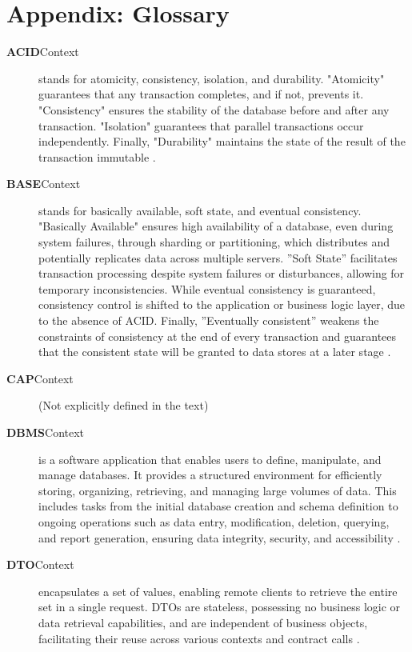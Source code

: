 \section{Appendix: Glossary}
\label{appendix:glossary}

\begin{description}

\item[\textbf{ACID}Context] stands for atomicity, consistency, isolation, and durability. "Atomicity" guarantees that any transaction completes, and if not, prevents it. "Consistency" ensures the stability of the database before and after any transaction. "Isolation" guarantees that parallel transactions occur independently. Finally, "Durability" maintains the state of the result of the transaction immutable \cite{jatana2012survey}.

\item[\textbf{BASE}Context] stands for basically available, soft state, and eventual consistency. "Basically Available" ensures high availability of a database, even during system failures, through sharding or partitioning, which distributes and potentially replicates data across multiple servers. ”Soft State” facilitates transaction processing despite system failures or disturbances, allowing for temporary inconsistencies. While eventual consistency is guaranteed, consistency control is shifted to the application or business logic layer, due to the absence of ACID. Finally, ”Eventually consistent” weakens the constraints of consistency at the end of every transaction and guarantees that the consistent state will be granted to data stores at a later stage \cite{mapanga2013database}.

\item[\textbf{CAP}Context] 
(Not explicitly defined in the text)

\item[\textbf{DBMS}Context] is a software application that enables users to define, manipulate, and manage databases. It provides a structured environment for efficiently storing, organizing, retrieving, and managing large volumes of data. This includes tasks from the initial database creation and schema definition to ongoing operations such as data entry, modification, deletion, querying, and report generation, ensuring data integrity, security, and accessibility \cite{rawat2021mysql}.

\item[\textbf{DTO}Context] encapsulates a set of values, enabling remote clients to retrieve the entire set in a single request. DTOs are stateless, possessing no business logic or data retrieval capabilities, and are independent of business objects, facilitating their reuse across various contexts and contract calls \cite{lee2018bridgify, pantaleev2007identifying, prakharenka2019development}.


\end{description}
